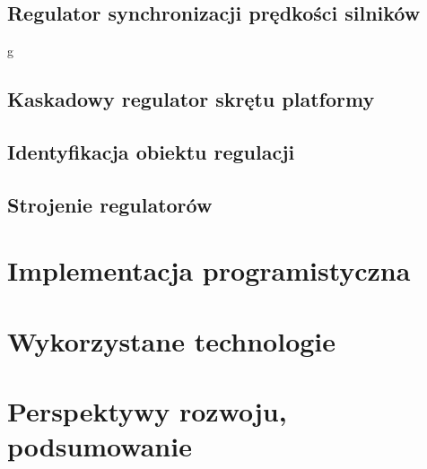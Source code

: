 \documentclass[11pt]{article}
\begin{document}
\subsection{Regulator synchronizacji prędkości silników}g
\subsection{Kaskadowy regulator skrętu platformy}
\subsection{Identyfikacja obiektu regulacji}
\subsection{Strojenie regulatorów}

\section{Implementacja programistyczna}

\section{Wykorzystane technologie}

\section{Perspektywy rozwoju, podsumowanie}
\end{document}
